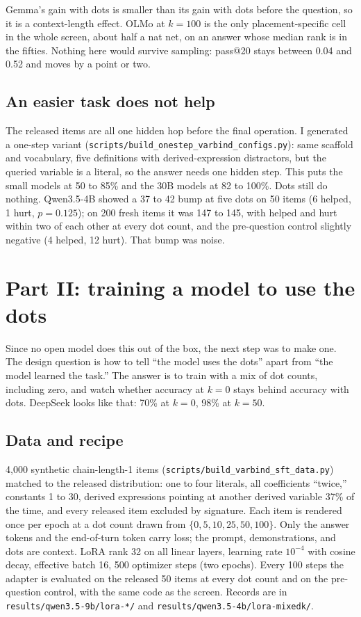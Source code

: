 \documentclass[11pt]{article}
\newcommand{\ttt}[1]{\texttt{\small #1}}
\begin{document}
Gemma's gain with dots is smaller than its gain with dots before the question, so it is a context-length effect. OLMo at $k=100$ is the only placement-specific cell in the whole screen, about half a nat net, on an answer whose median rank is in the fifties. Nothing here would survive sampling: pass@20 stays between 0.04 and 0.52 and moves by a point or two.

\subsection{An easier task does not help}

The released items are all one hidden hop before the final operation. I generated a one-step variant (\ttt{scripts/build\_onestep\_varbind\_configs.py}): same scaffold and vocabulary, five definitions with derived-expression distractors, but the queried variable is a literal, so the answer needs one hidden step. This puts the small models at 50 to 85\% and the 30B models at 82 to 100\%. Dots still do nothing. Qwen3.5-4B showed a 37 to 42 bump at five dots on 50 items (6 helped, 1 hurt, $p = 0.125$); on 200 fresh items it was 147 to 145, with helped and hurt within two of each other at every dot count, and the pre-question control slightly negative (4 helped, 12 hurt). That bump was noise.

\section{Part II: training a model to use the dots}

Since no open model does this out of the box, the next step was to make one. The design question is how to tell ``the model uses the dots'' apart from ``the model learned the task.'' The answer is to train with a mix of dot counts, including zero, and watch whether accuracy at $k=0$ stays behind accuracy with dots. DeepSeek looks like that: 70\% at $k=0$, 98\% at $k=50$.

\subsection{Data and recipe}

4,000 synthetic chain-length-1 items (\ttt{scripts/build\_varbind\_sft\_data.py}) matched to the released distribution: one to four literals, all coefficients ``twice,'' constants 1 to 30, derived expressions pointing at another derived variable 37\% of the time, and every released item excluded by signature. Each item is rendered once per epoch at a dot count drawn from $\{0, 5, 10, 25, 50, 100\}$. Only the answer tokens and the end-of-turn token carry loss; the prompt, demonstrations, and dots are context. LoRA rank 32 on all linear layers, learning rate $10^{-4}$ with cosine decay, effective batch 16, 500 optimizer steps (two epochs). Every 100 steps the adapter is evaluated on the released 50 items at every dot count and on the pre-question control, with the same code as the screen. Records are in \ttt{results/qwen3.5-9b/lora-*/} and \ttt{results/qwen3.5-4b/lora-mixedk/}.
\end{document}
